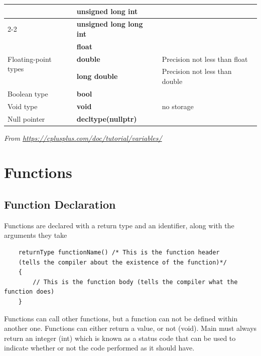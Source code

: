 \documentclass[]{article}
\begin{document}
\begin{table}[]
\begin{tabular}{@{}lll@{}}
		& \textbf{unsigned long int}      &                                                    \\ \cmidrule(lr){2-2}
		& \textbf{unsigned long long int} &                                                    \\ \midrule
		\multirow{3}{*}{Floating-point types} & \textbf{float}                  &                                                    \\ \cmidrule(l){2-3} 
		& \textbf{double}                 & Precision not less than float                      \\ \cmidrule(l){2-3} 
		& \textbf{long double}            & Precision not less than double                     \\ \midrule
		Boolean type                          & \textbf{bool}                   &                                                    \\ \midrule
		Void type                             & \textbf{void}                   & no storage                                         \\ \midrule
		Null pointer                          & \textbf{decltype(nullptr)}      &                                                    \\ \bottomrule
	\end{tabular}
	
	\textit{From \url{https://cplusplus.com/doc/tutorial/variables/}}
\end{table}
\section{Functions}

\subsection{Function Declaration}

Functions are declared with a return type and an identifier, along with the arguments they take

\begin{verbatim}
	returnType functionName() /* This is the function header 
	(tells the compiler about the existence of the function)*/
	{
		// This is the function body (tells the compiler what the function does)
	}
\end{verbatim}
Functions can call other functions, but a function can not be defined within another one.
Functions can either return a value, or not (void).
Main must always return an integer (int) which is known as a status code that can be used to indicate whether or not the code performed as it should have.
\end{document}
